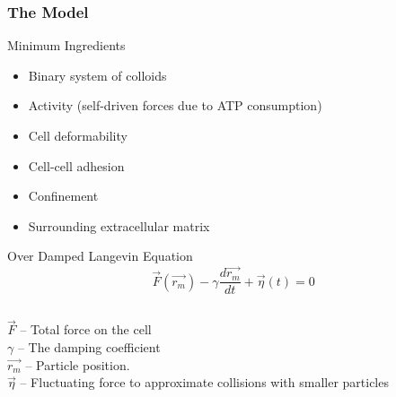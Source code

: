 \documentclass{beamer}
\begin{document}
  
  \begin{frame}
    \frametitle{The Model}
    Minimum Ingredients
    \begin{itemize}
    \item Binary system of colloids 
    \item Activity (self-driven forces due to ATP consumption)
    \item Cell deformability
    \item Cell-cell adhesion
    \item Confinement
    \item Surrounding extracellular matrix
    \end{itemize}
    
	\begin{exampleblock}{Over Damped Langevin Equation}
	$$\vec{F}(\vec{r _m}) - \gamma \frac{d\vec{r_m}}{dt} + \vec{\eta}(t) = 0$$
	\end{exampleblock}
	\begin{columns}[t]
     $\vec{F}$ -- Total force on the cell \\
     $\gamma$ -- The damping coefficient \\
      $\vec{r_m}$ -- Particle position. \\
    $\vec{\eta}$ -- Fluctuating force to approximate collisions with smaller particles \\
    \end{columns}
    
    \vfill
    
  \end{frame}
  
\end{document}
